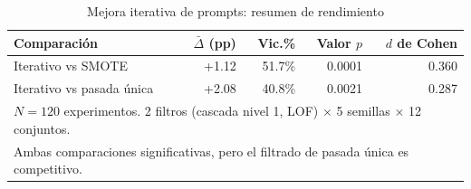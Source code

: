 \begin{table}[htbp]
\centering
\caption{Mejora iterativa de prompts: resumen de rendimiento}
\label{tab:closed_loop_summary}
\begin{tabular}{lrrrr}
\toprule
\textbf{Comparación} & \textbf{$\bar{\Delta}$ (pp)} & \textbf{Vic.\%} & \textbf{Valor $p$} & \textbf{$d$ de Cohen} \\
\midrule
Iterativo vs SMOTE         & +1.12 & 51.7\% & 0.0001 & 0.360 \\
Iterativo vs pasada única  & +2.08 & 40.8\% & 0.0021 & 0.287 \\
\midrule
\multicolumn{5}{l}{\small $N=120$ experimentos. 2 filtros (cascada nivel 1, LOF) $\times$ 5 semillas $\times$ 12 conjuntos.} \\
\multicolumn{5}{l}{\small Ambas comparaciones significativas, pero el filtrado de pasada única es competitivo.} \\
\bottomrule
\end{tabular}
\end{table}
